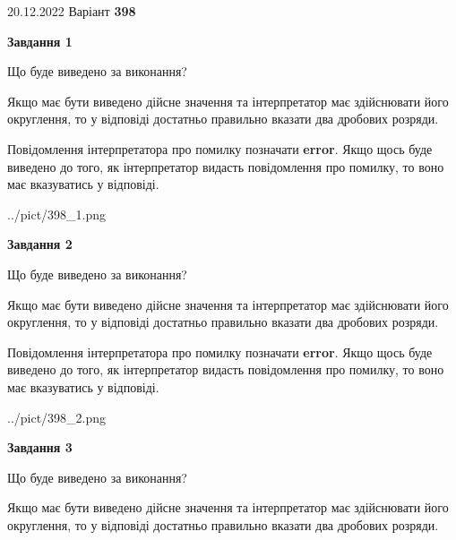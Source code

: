 \documentclass[12pt, ukrainian]{article}
\begin{document}
{20.12.2022 Варіант \No \textbf { 398 }\par}
{
\begin {Large}

{\begin {center}\textbf{Завдання 1}\end {center}}\par
Що буде виведено за виконання? \par

Якщо має бути виведено дійсне значення та інтерпретатор має здійснювати його округлення, 
то у відповіді достатньо правильно вказати два дробових розряди.

Повідомлення інтерпретатора про помилку позначати \textbf{error}.
Якщо щось буде виведено до того, як інтерпретатор видасть повідомлення про помилку, 
то воно має вказуватись у відповіді. \par

\begin{center}
	{../pict/398_1.png}
\end{center}
\newpage

{\begin {center}\textbf{Завдання 2}\end {center}}\par
Що буде виведено за виконання? \par

Якщо має бути виведено дійсне значення та інтерпретатор має здійснювати його округлення, 
то у відповіді достатньо правильно вказати два дробових розряди.

Повідомлення інтерпретатора про помилку позначати \textbf{error}.
Якщо щось буде виведено до того, як інтерпретатор видасть повідомлення про помилку, 
то воно має вказуватись у відповіді. \par

\begin{center}
	{../pict/398_2.png}
\end{center}
\newpage

{\begin {center}\textbf{Завдання 3}\end {center}}\par
Що буде виведено за виконання? \par

Якщо має бути виведено дійсне значення та інтерпретатор має здійснювати його округлення, 
то у відповіді достатньо правильно вказати два дробових розряди.


\end{Large}}
\end{document}
